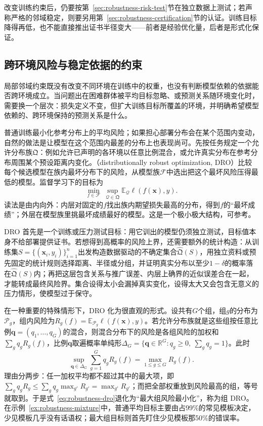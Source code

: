 改变训练约束后，仍要按第~\ref{sec:robustness-risk-test}节在独立数据上测试；若声称严格的邻域稳定，则要另用第~\ref{sec:robustness-certification}节的认证。训练目标降得再低，也不能直接推出证书半径变大——前者是经验优化量，后者是形式化保证。

\subsection{跨环境风险与稳定依据的约束}
\label{sec:robustness-environment-enhancement}

局部邻域约束既没有改变不同环境在训练中的权重，也没有判断模型依赖的依据能否跨环境成立。当问题出在困难群体被平均目标忽略、或预测关系随环境变化时，需要换一个层次：损失定义不变，但扩大训练目标所覆盖的环境，并明确希望模型依赖的、跨环境保持的预测关系是什么。

普通训练最小化参考分布上的平均风险；如果担心部署分布会在某个范围内变动，自然的做法是让模型在这个范围内最差的分布上也表现尚可。先按任务规定一个允许分布族$\mathfrak Q$：例如允许已声明的各环境以任意比例混合，或允许真实分布在参考分布周围某个预设距离内变化。（distributionally robust optimization, DRO）比较每个候选模型在族内最坏分布下的风险，从模型族$\mathcal F$中选出把这个最坏风险压得最低的模型。监督学习下的目标为
\begin{equation}
 \min_{f\in\mathcal F}\ \sup_{\mathcal Q\in\mathfrak Q}
   \mathbb E_{\mathcal Q}\ell(f(\bm{x}),y).
 \label{eq:robustness-dro}
\end{equation}
读法是由内向外：内层对固定的$f$找出族内期望损失最高的分布，得到$f$的“最坏成绩”；外层在模型族里挑最坏成绩最好的模型。这是一个极小极大结构，可参考。

DRO 首先是一个训练或压力测试目标：用它训出的模型仍须独立测试，目标值本身不给部署提供证书。若想得到高概率的风险上界，还需要额外的统计构造：从训练集$S=\{(\bm{x}_i,y_i)\}_{i=1}^n$出发构造数据驱动的不确定集合$\widehat{\mathfrak Q}(S)$，用独立资料或预先固定的统计规则选择距离、半径或分组，并证明真实分布以至少$1-\delta$的概率落在$\widehat{\mathfrak Q}(S)$内；再把这层包含关系与推广误差、内层上确界的近似误差合在一起，才能转成最终风险界。集合设得太小会漏掉真实变化，设得太大又会包含无意义的压力情形，使模型过于保守。

在一种重要的特殊情形下，DRO 化为很直观的形式。设共有$G$个组，组$g$的分布为$\mathcal P_g$，组内风险为$R_g(f)=\mathbb E_{\mathcal P_g}\ell(f(\bm{x}),y)$。若允许分布族就是这些组按任意比例$\bm q=(q_1,\ldots,q_G)$的混合，则混合分布下的风险是各组风险的加权和$\sum_gq_gR_g(f)$，比例$\bm q$取遍概率单纯形$\Delta_G=\{\bm q\in\mathbb R^G:q_g\geq0,\ \sum_gq_g=1\}$。此时
\begin{equation}
 \sup_{\bm{q}\in\Delta_G}\sum_{g=1}^{G}q_gR_g(f)
       =\max_{1\leq g\leq G}R_g(f).
 \label{eq:robustness-group-dro}
\end{equation}
理由分两步：任一加权平均都不超过其中的最大项，即$\sum_gq_gR_g\leq\sum_gq_g\max_{g'}R_{g'}=\max_{g'}R_{g'}$；而把全部权重放到风险最高的组，等号就取到。于是式~\eqref{eq:robustness-dro}退化为“最大组风险最小化”，称为组 DRO。在示例~\ref{ex:robustness-mixture}中，普通平均目标主要由占99\%的常见模板决定，少见模板几乎没有话语权；最大组目标则首先盯住少见模板那50\%的错误率。

